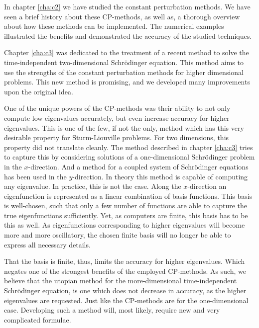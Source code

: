 

\label{cha:c4}

In chapter \ref{cha:c2} we have studied the constant perturbation methods. We have seen a brief history about these CP-methods, as well as, a thorough overview about how these methods can be implemented. The numerical examples illustrated the benefits and demonstrated the accuracy of the studied techniques.

Chapter \ref{cha:c3} was dedicated to the treatment of a recent method to solve the time-independent two-dimensional Schrödinger equation. This method aims to use the strengths of the constant perturbation methods for higher dimensional problems. This new method is promising, and we developed many improvements upon the original idea.

One of the unique powers of the CP-methods was their ability to not only compute low eigenvalues accurately, but even increase accuracy for higher eigenvalues. This is one of the few, if not the only, method which has this very desirable property for Sturm-Liouville problems. For two dimensions, this property did not translate cleanly. The method described in chapter \ref{cha:c3} tries to capture this by considering solutions of a one-dimensional Schrödinger problem in the $x$-direction. And a method for a coupled system of Schrödinger equations has been used in the $y$-direction. In theory this method is capable of computing any eigenvalue. In practice, this is not the case. Along the $x$-direction an eigenfunction is represented as a linear combination of basis functions. This basis is well-chosen, such that only a few number of functions are able to capture the true eigenfunctions sufficiently. Yet, as computers are finite, this basis has to be this as well. As eigenfunctions corresponding to higher eigenvalues will become more and more oscillatory, the chosen finite basis will no longer be able to express all necessary details.

That the basis is finite, thus, limits the accuracy for higher eigenvalues. Which negates one of the strongest benefits of the employed CP-methods. As such, we believe that the utopian method for the more-dimensional time-independent Schrödinger equation, is one which does not decrease in accuracy, as the higher eigenvalues are requested. Just like the CP-methods are for the one-dimensional case. Developing such a method will, most likely, require new and very complicated formulae.

